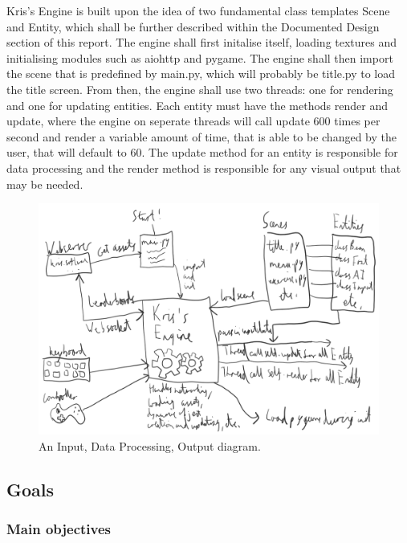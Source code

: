 \documentclass{report}
\begin{document}
Kris's Engine is built upon the idea of two fundamental class templates Scene and Entity, which shall be further described within the Documented Design section of this report. The engine shall first initalise itself, loading textures and initialising modules such as aiohttp and pygame. The engine shall then import the scene that is predefined by main.py, which will probably be title.py to load the title screen. From then, the engine shall use two threads: one for rendering and one for updating entities. Each entity must have the methods render and update, where the engine on seperate threads will call update 600 times per second and render a variable amount of time, that is able to be changed by the user, that will default to 60. The update method for an entity is responsible for data processing and the render method is responsible for any visual output that may be needed.

\begin{figure}[ht]
\centering
\includegraphics[width=1\textwidth]{idpo.png}
\caption{\label{fig:idpo}An Input, Data Processing, Output diagram.}
\end{figure}

\subsection{Goals}

\subsubsection{Main objectives}
\end{document}
